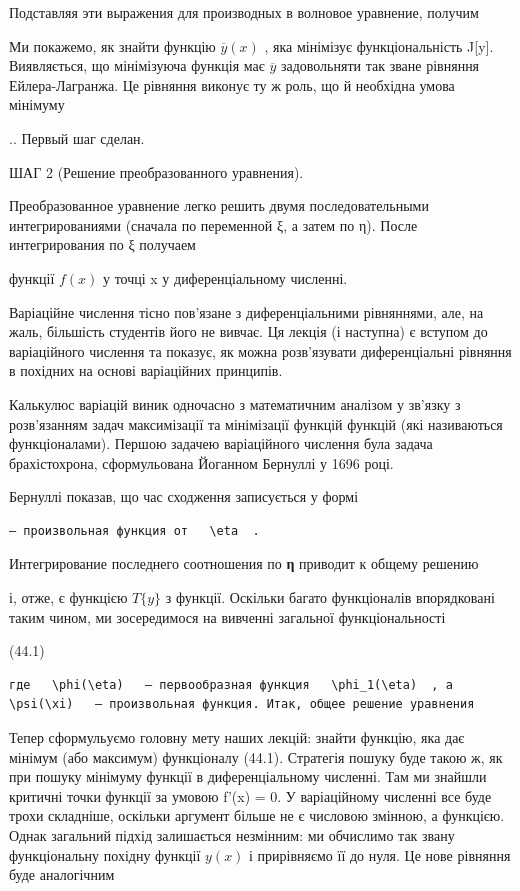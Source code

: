 \documentclass[
  ukrainian,
]{article}
\begin{document}
Подставляя эти выражения для производных в волновое уравнение, получим

Ми покажемо, як знайти функцію \(\overline{y}(x)\) , яка мінімізує
функціональність J{[}y{]}. Виявляється, що мінімізуюча функція має
\(\overline{y}\) задовольняти так зване рівняння Ейлера-Лагранжа. Це
рівняння виконує ту ж роль, що й необхідна умова мінімуму

.. Первый шаг сделан.

ШАГ 2 (Решение преобразованного уравнения).

Преобразованное уравнение легко решить двумя последовательными
интегрированиями (сначала по переменной ξ, а затем по η). После
интегрирования по ξ получаем

функції \(f(x)\) у точці x у диференціальному численні.

Варіаційне числення тісно пов'язане з диференціальними рівняннями, але,
на жаль, більшість студентів його не вивчає. Ця лекція (і наступна) є
вступом до варіаційного числення та показує, як можна розв'язувати
диференціальні рівняння в похідних на основі варіаційних принципів.

Калькулюс варіацій виник одночасно з математичним аналізом у зв'язку з
розв'язанням задач максимізації та мінімізації функцій функцій (які
називаються функціоналами). Першою задачею варіаційного числення була
задача брахістохрона, сформульована Йоганном Бернуллі у 1696 році.

Бернуллі показав, що час сходження записується у формі

\begin{verbatim}
— произвольная функция от   \eta  .
\end{verbatim}

Интегрирование последнего соотношения по \textbf{η} приводит к общему
решению

і, отже, є функцією \(T\{y\}\) з функції. Оскільки багато функціоналів
впорядковані таким чином, ми зосередимося на вивченні загальної
функціональності

(44.1)

\begin{verbatim}
где   \phi(\eta)   — первообразная функция   \phi_1(\eta)  , а   \psi(\xi)   — произвольная функция. Итак, общее решение уравнения
\end{verbatim}

Тепер сформульуємо головну мету наших лекцій: знайти функцію, яка дає
мінімум (або максимум) функціоналу (44.1). Стратегія пошуку буде такою
ж, як при пошуку мінімуму функції в диференціальному численні. Там ми
знайшли критичні точки функції за умовою f'(x) = 0. У варіаційному
численні все буде трохи складніше, оскільки аргумент більше не є
числовою змінною, а функцією. Однак загальний підхід залишається
незмінним: ми обчислимо так звану функціональну похідну функції \(y(x)\)
і прирівняємо її до нуля. Це нове рівняння буде аналогічним
\end{document}
